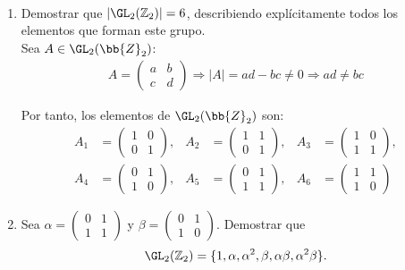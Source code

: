 \begin{ejercicio}\label{ej:2.10}~
    \begin{enumerate}
        \item Demostrar que $|\GL_2(\mathbb{Z}_2)| = 6$, describiendo explícitamente todos los elementos que forman este grupo.\\
        
        Sea $A\in \GL_2(\bb{Z}_2)$:
        \begin{align*}
            A = \begin{pmatrix} a & b \\ c & d \end{pmatrix} \Longrightarrow |A| = ad - bc \neq 0\Longrightarrow ad \neq bc
        \end{align*}

        Por tanto, los elementos de $\GL_2(\bb{Z}_2)$ son:
        \begin{align*}
            A_1 &= \begin{pmatrix} 1 & 0 \\ 0 & 1 \end{pmatrix}, & A_2 &= \begin{pmatrix} 1 & 1 \\ 0 & 1 \end{pmatrix}, & A_3 &= \begin{pmatrix} 1 & 0 \\ 1 & 1 \end{pmatrix},\\
            A_4 &= \begin{pmatrix} 0 & 1 \\ 1 & 0 \end{pmatrix}, & A_5 &= \begin{pmatrix} 0 & 1 \\ 1 & 1 \end{pmatrix}, & A_6 &= \begin{pmatrix} 1 & 1 \\ 1 & 0 \end{pmatrix}
        \end{align*}
        \item Sea $\alpha = \begin{pmatrix} 0 & 1 \\ 1 & 1 \end{pmatrix}$ y $\beta = \begin{pmatrix} 0 & 1 \\ 1 & 0 \end{pmatrix}$. Demostrar que
        $$\GL_2(\mathbb{Z}_2) = \{1, \alpha, \alpha^2, \beta, \alpha\beta, \alpha^2\beta\}.$$


\end{enumerate}
\end{ejercicio}
